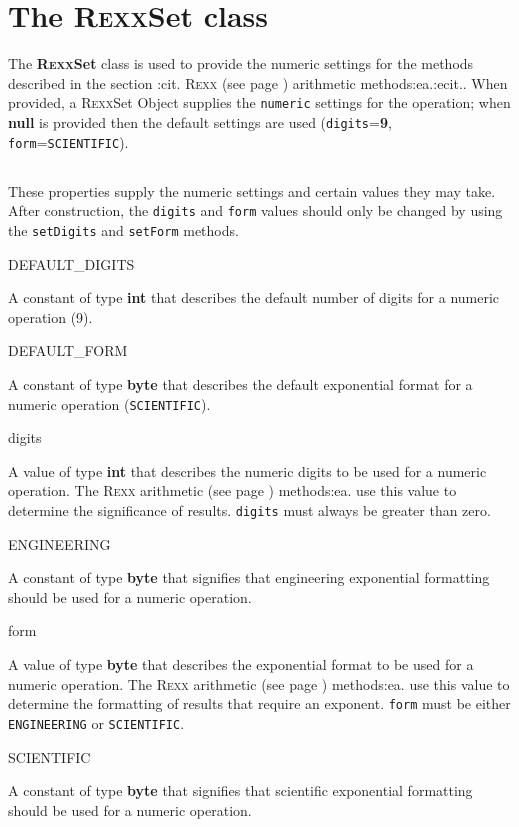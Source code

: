 \chapter{The R\textsc{exx}Set class}\label{refnlrset}
 
The \textbf{R\textsc{exx}Set} class is used to provide the numeric settings for
the methods described in the section :cit. R\textsc{exx} (see page \pageref{refrexxops}) 
arithmetic methods:ea.:ecit..
When provided, a R\textsc{exx}Set Object supplies the \texttt{numeric} settings
for the operation; when \textbf{null} is provided then the default
settings are used (\texttt{digits}=\textbf{9},
\texttt{form}=\texttt{SCIENTIFIC}).
\section{}\label{}
 
These properties supply the numeric settings and certain values they may
take.  After construction, the \texttt{digits} and \texttt{form} values
should only be changed by using the \texttt{setDigits} and
\texttt{setForm} methods.
\begin{description}
\item{DEFAULT\_DIGITS}

A constant of type \textbf{int} that describes the default number of
digits for a numeric operation (9).
\item{DEFAULT\_FORM}

A constant of type \textbf{byte} that describes the default exponential
format for a numeric operation (\texttt{SCIENTIFIC}).
\item{digits}

A value of type \textbf{int} that describes the numeric digits to be
used for a numeric operation.  The  R\textsc{exx} arithmetic (see page \pageref{refrexxops}) 
methods:ea. use this value to determine the significance of results.
\texttt{digits} must always be greater than zero.
\item{ENGINEERING}

A constant of type \textbf{byte} that signifies that engineering
exponential formatting should be used for a numeric operation.
\item{form}

A value of type \textbf{byte} that describes the exponential format to
be used for a numeric operation.  The  R\textsc{exx} arithmetic (see page \pageref{refrexxops}) 
methods:ea. use this value to determine the formatting of results that
require an exponent.
\texttt{form} must be either \texttt{ENGINEERING} or \texttt{SCIENTIFIC}.
\item{SCIENTIFIC}

A constant of type \textbf{byte} that signifies that scientific
exponential formatting should be used for a numeric operation.
\end{description}
